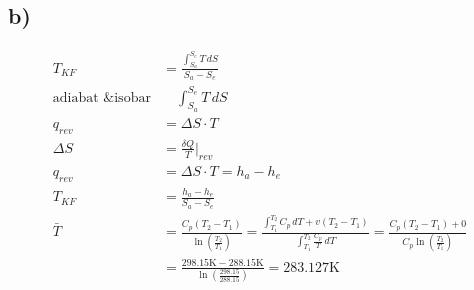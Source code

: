

\subsection*{b)}
\begin{align*}
T_{KF} &= \frac{\int_{S_a}^{S_e} T \, dS}{S_a - S_e} \\
\text{adiabat \& isobar} & \quad \int_{S_a}^{S_e} T \, dS \\
q_{rev} &= \Delta S \cdot T \\
\Delta S &= \frac{\delta Q}{T} \bigg|_{rev} \\
q_{rev} &= \Delta S \cdot T = h_a - h_e \\
T_{KF} &= \frac{h_a - h_e}{S_a - S_e} \\
\bar{T} &= \frac{C_p (T_2 - T_1)}{\ln \left( \frac{T_2}{T_1} \right)} = \frac{\int_{T_1}^{T_2} C_p \, dT + v(T_2 - T_1)}{\int_{T_1}^{T_2} \frac{C_p}{T} \, dT} = \frac{C_p (T_2 - T_1) + 0}{C_p \ln \left( \frac{T_2}{T_1} \right)} \\
&= \frac{298.15 \text{K} - 288.15 \text{K}}{\ln \left( \frac{298.15}{288.15} \right)} = 283.127 \text{K}
\end{align*}